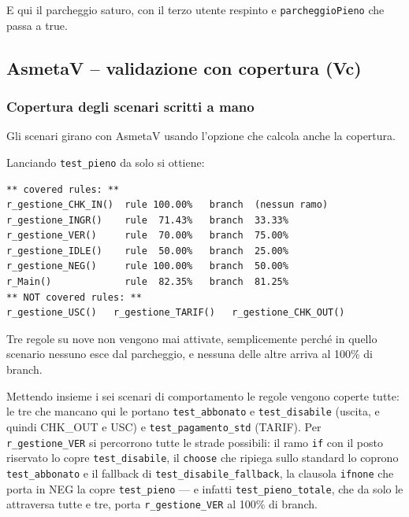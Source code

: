 
E qui il parcheggio saturo, con il terzo utente respinto e \texttt{parcheggioPieno} che
passa a true.



\subsection{AsmetaV -- validazione con copertura (Vc)}\label{sec:asmetav-vc}

\subsubsection{Copertura degli scenari scritti a mano}

Gli scenari girano con AsmetaV usando l'opzione che calcola anche la copertura.

Lanciando \texttt{test\_pieno} da solo si ottiene:

\begin{lstlisting}[style=terminal, caption={Copertura del solo test\_pieno.avalla}]
** covered rules: **
r_gestione_CHK_IN()  rule 100.00%   branch  (nessun ramo)
r_gestione_INGR()    rule  71.43%   branch  33.33%
r_gestione_VER()     rule  70.00%   branch  75.00%
r_gestione_IDLE()    rule  50.00%   branch  25.00%
r_gestione_NEG()     rule 100.00%   branch  50.00%
r_Main()             rule  82.35%   branch  81.25%
** NOT covered rules: **
r_gestione_USC()   r_gestione_TARIF()   r_gestione_CHK_OUT()
\end{lstlisting}

Tre regole su nove non vengono mai attivate, semplicemente perché in quello scenario
nessuno esce dal parcheggio, e nessuna delle altre arriva al 100\% di branch.

Mettendo insieme i sei scenari di comportamento le regole vengono coperte tutte: le tre
che mancano qui le portano \texttt{test\_abbonato} e \texttt{test\_disabile} (uscita, e
quindi CHK\_OUT e USC) e \texttt{test\_pagamento\_std} (TARIF). Per
\texttt{r\_gestione\_VER} si percorrono tutte le strade possibili: il ramo \texttt{if} con
il posto riservato lo copre \texttt{test\_disabile}, il \texttt{choose} che ripiega sullo
standard lo coprono \texttt{test\_abbonato} e il fallback di
\texttt{test\_disabile\_fallback}, la clausola \texttt{ifnone} che porta in NEG la copre
\texttt{test\_pieno} — e infatti \texttt{test\_pieno\_totale}, che da solo le attraversa
tutte e tre, porta \texttt{r\_gestione\_VER} al 100\% di branch.

